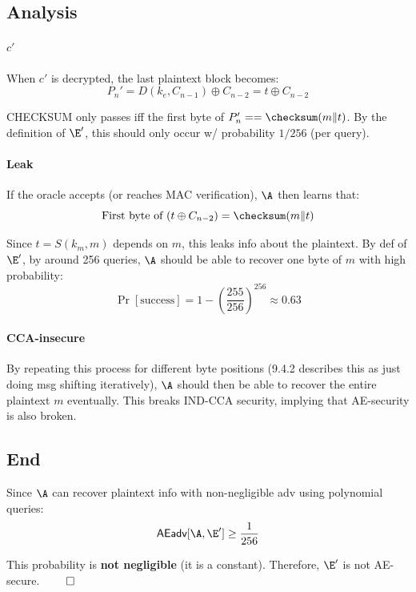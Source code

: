 \documentclass[12pt]{article}
\begin{document}
\begin{solution}
\subsection*{Analysis}
\paragraph{$c'$} When $c'$ is decrypted, the last plaintext block becomes:
\begin{equation*}
    P_n' = D(k_e, C_{n-1}) \oplus C_{n-2} = t \oplus C_{n-2}
\end{equation*}

\noindent CHECKSUM only passes iff the first byte of $P_n' == \checksum(m \| t)$. By the definition of $\E'$, this should only occur w/ probability $1/256$ (per query).

\paragraph{Leak} If the oracle accepts (or reaches MAC verification), $\A$ then learns that:
\begin{equation*}
    \text{First byte of } (t \oplus C_{n-2}) = \checksum(m \| t)
\end{equation*}

\noindent Since $t = S(k_m, m)$ depends on $m$, this leaks info about the plaintext. By def of $\E'$, by around 256 queries, $\A$ should be able to recover one byte of $m$ with high probability:
\begin{equation*}
    \Pr[\text{success}] = 1 - \left(\frac{255}{256}\right)^{256} \approx 0.63
\end{equation*}

\paragraph{CCA-insecure} By repeating this process for different byte positions (9.4.2 describes this as just doing msg shifting iteratively), $\A$ should then be able to recover the entire plaintext $m$ eventually. This breaks IND-CCA security, implying that AE-security is also broken.

\subsection*{End}
Since $\A$ can recover plaintext info with non-negligible adv using polynomial queries:
\begin{equation*}
    \textsf{AEadv}[\A, \E'] \geq \frac{1}{256}
\end{equation*}

\noindent This probability is \textbf{not negligible} (it is a constant). Therefore, $\E'$ is not AE-secure. $\qed$
\end{solution}
\end{document}
